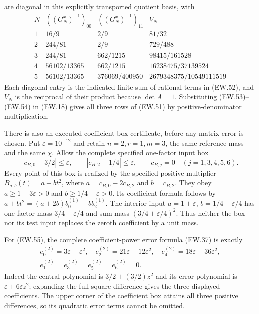 \documentclass[11pt]{article}
\begin{document}
are diagonal in this explicitly transported quotient basis, with
\[
\begin{array}{c|c|c|c}
 N&((G_N^x)^{-1})_{00}&((G_N^x)^{-1})_{11}&V_N\\\hline
 1&16/9&2/9&81/32\\
 2&244/81&2/9&729/488\\
 3&244/81&662/1215&98415/161528\\
 4&56102/13365&662/1215&16238475/37139524\\
 5&56102/13365&376069/400950&2679348375/10549111519
\end{array}                                                   \tag{EW.54}
\]
Each diagonal entry is the indicated finite sum of rational terms
in (EW.52), and $V_N$ is the reciprocal of their product because
$\det A=1$. Substituting (EW.53)--(EW.54) in (EW.18) gives all
three rows of (EW.51) by positive-denominator multiplication.

There is also an executed coefficient-box certificate, before any
matrix error is chosen. Put $\varepsilon=10^{-12}$ and retain
$n=2,r=1,m=3$, the same reference mass and the same $\chi$.
Allow the complete specified one-factor input box
\[
 |c_{B,0}-3/2|\le\varepsilon,\qquad
 |c_{B,2}-1/4|\le\varepsilon,\qquad
 c_{B,j}=0\quad(j=1,3,4,5,6).                               \tag{EW.55}
\]
Every point of this box is realized by the specified positive multiplier
$B_{a,b}(t)=a+bt^2$, where $a=c_{B,0}-2c_{B,2}$ and
$b=c_{B,2}$. They obey $a\ge1-3\varepsilon>0$ and
$b\ge1/4-\varepsilon>0$. Its coefficient formula follows by
$a+bt^2=(a+2b)b_0^{(1)}+b b_2^{(1)}$.
The interior input $a=1+\varepsilon$, $b=1/4-\varepsilon/4$
has one-factor mass $3/4+\varepsilon/4$ and sum mass
$(3/4+\varepsilon/4)^2$. Thus neither the box nor its test input
replaces the zeroth coefficient by a unit mass.

For (EW.55), the complete coefficient-power error formula (EW.37)
is exactly
\[
 \begin{gathered}
 e_0^{(2)}=3\varepsilon+\varepsilon^2,\quad
 e_2^{(2)}=21\varepsilon+12\varepsilon^2,\quad
 e_4^{(2)}=18\varepsilon+36\varepsilon^2,\\
 e_1^{(2)}=e_3^{(2)}=e_5^{(2)}=e_6^{(2)}=0.
 \end{gathered}                                               \tag{EW.56}
\]
Indeed the central polynomial is $3/2+(3/2)z^2$ and its error
polynomial is $\varepsilon+6\varepsilon z^2$; expanding the
full square difference gives the three displayed coefficients.
The upper corner of the coefficient box attains all three positive
differences, so its quadratic error terms cannot be omitted.
\end{document}
